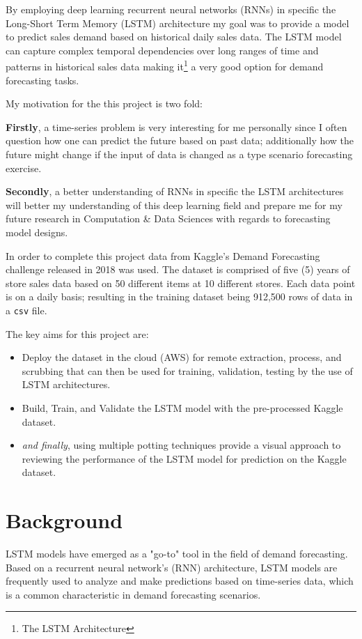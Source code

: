 \documentclass[10pt, journal, letterpaper, compsoc]{IEEEtran}
\begin{document}
By employing deep learning recurrent neural networks (RNNs) in specific the Long-Short Term Memory (LSTM) architecture my goal was to provide a model to predict sales demand based on historical daily sales data. The LSTM model can capture complex temporal dependencies over long ranges of time and patterns in historical sales data\cite{pharma-sales-forecast-lstm, predicting-sales-lstm, lstm-gru-performance} making it\footnote{The LSTM Architecture} a very good option for demand forecasting tasks.

My motivation for the this project is two fold:

\textbf{Firstly}, a time-series problem is very interesting for me personally since I often question how one can predict the future based on past data; additionally how the future might change if the input of data is changed as a type scenario forecasting exercise.

\textbf{Secondly}, a better understanding of RNNs in specific the LSTM architectures will better my understanding of this deep learning field and prepare me for my future research in Computation \& Data Sciences with regards to forecasting model designs.

In order to complete this project data from Kaggle's Demand Forecasting challenge\cite{demand-forecasting-kernels-only} released in 2018 was used. The dataset is comprised of five (5) years of store sales data based on 50 different items at 10 different stores. Each data point is on a daily basis; resulting in the training dataset being 912,500 rows of data in a \texttt{csv} file. 

The key aims for this project are:
\begin{itemize}
    \item Deploy the dataset in the cloud (AWS) for remote extraction, process, and scrubbing that can then be used for training, validation, testing by the use of LSTM architectures.
    \item Build, Train, and Validate the LSTM model with the pre-processed Kaggle\cite{demand-forecasting-kernels-only} dataset.
    \item \textit{and finally}, using multiple potting techniques provide a visual approach to reviewing the performance of the LSTM model for prediction on the Kaggle\cite{demand-forecasting-kernels-only} dataset.
\end{itemize}

\section{Background}
LSTM models have emerged as a "go-to" tool\cite{pharma-sales-forecast-lstm, predicting-sales-lstm} in the field of demand forecasting. Based on a recurrent neural network's (RNN) architecture, LSTM models are frequently used\cite{pharma-sales-forecast-lstm} to analyze and make predictions based on time-series data, which is a common characteristic in demand forecasting scenarios.
\end{document}
